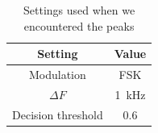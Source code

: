 \documentclass[11pt,titlepage]{report}
\begin{document}
\begin{appendices}
\begin{table}[H]
	\centering
	\caption{Settings used when we encountered the peaks}
	\label{tab:app-ber}
	\begin{tabular}{c c}
		\hline\hline
		Setting & Value \\
		\hline
		Modulation & FSK \\
		$\Delta F$ & \SI{1}{kHz} \\
		Decision threshold & \num{0.6} \\
		\hline
	\end{tabular}
\end{table}

\end{appendices}
\end{document}
